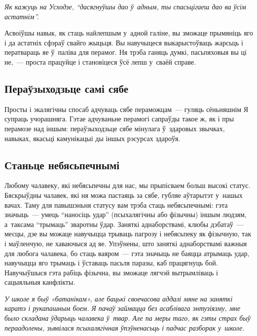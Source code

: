 \emph{Як кажуць на Усходзе, ``дасягнуўшы дао ў~адным, ты спасьцігаеш дао ва ўсім астатнім''.}

Асвоіўшы навык, як стаць найлепшым у~адной галіне, вы зможаце прымяніць яго і да астатніх сфэраў свайго жыцьця. Вы навучыцеся выкарыстоўваць жарсьць і ператвараць яе ў~паліва для перамог. Ня трэба ганяць думкі, пасьпяховыя вы ці не,~--- проста працуйце і становіцеся ўсё лепш у~сваёй справе.

\subsection*{Пераўзыходзьце самі сябе}

Просты і экалягічны спосаб адчуваць сябе пераможцам~--- гуляць сёньняшнім Я супраць учорашняга. Гэтае адчуваньне перамогі сапраўды такое ж, як і пры перамозе над іншым: пераўзыходзьце сябе мінулага ў~здаровых звычках, навыках, якасьці камунікацыі ды іншых рэсурсах здароўя.


\subsection*{Станьце небясьпечнымі}

Любому чалавеку, які небясьпечны для нас, мы прыпісваем больш высокі статус. Бяскрыўдны чалавек, які ня можа пастаяць за сябе, губляе аўтарытэт у~нашых вачах. Таму для павышэньня статусу вам трэба стаць небясьпечнымі: гэта значыць~--- умець ``наносіць удар'' (псыхалягічны або фізычны) іншым людзям, а~таксама ``трымаць'' зваротны ўдар. Заняткі аднаборствамі, клюбы дэбатаў~--- месцы, дзе вы можаце навучыцца трываць пагрозу і небясьпеку як фізычную, так і маўленчую, не хаваючыся ад яе. Упэўнены, што заняткі аднаборствамі важныя для любога чалавека, бо стаць ваяром~--- гэта значыць не баяцца атрымаць удар, навучыцца яго трымаць і ўставаць пасьля паразы, каб працягнуць бой. Навучыўшыся гэта рабіць фізычна, вы зможаце лягчэй вытрымліваць і сацыяльныя канфлікты.

\emph{У школе я быў «батанікам», але бацькі своечасова аддалі мяне на заняткі каратэ і рукапашным боем. Я пачаў займацца без асаблівага энтузіязму, мне было складана ўдарыць чалавека ў~твар. Але па меры таго, як гэты страх быў пераадолены, зьявілася псыхалягічная ўпэўненасьць і падчас разборак у~школе.}


